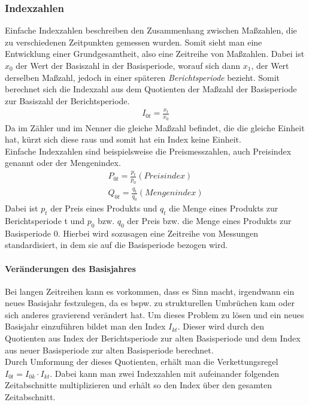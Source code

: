 \documentclass[a4paper]{article}
\begin{document}
\subsubsection{Indexzahlen}
Einfache Indexzahlen beschreiben den Zusammenhang zwischen Maßzahlen, die zu verschiedenen Zeitpunkten gemessen wurden. Somit sieht man eine Entwicklung einer Grundgesamtheit, also eine Zeitreihe von Maßzahlen. 
Dabei ist $x_0$ der Wert der Basiszahl in der Basisperiode, worauf sich dann $x_1$, der Wert derselben Maßzahl, jedoch in einer späteren \textit{Berichtsperiode} bezieht. Somit berechnet sich die Indexzahl aus dem Quotienten der Maßzahl der Basisperiode zur Basiszahl der Berichtsperiode.
\begin{align*}
    I_{0t}=\frac{x_t}{x_0}
\end{align*}
Da im Zähler und im Nenner die gleiche Maßzahl befindet, die die gleiche Einheit hat, kürzt sich diese raus und somit hat ein Index keine Einheit.\\
Einfache Indexzahlen sind beispielsweise die Preismesszahlen, auch Preisindex genannt oder der Mengenindex. 
\begin{align*}
    P_{0t}=\frac{p_t}{p_0} (Preisindex)\\
    Q_{0t}=\frac{q_t}{q_0} (Mengenindex)
\end{align*}
Dabei ist $p_t$ der Preis eines Produkts und $q_t$ die Menge eines Produkts zur Berichtsperiode t und $p_0$ bzw. $q_0$ der Preis bzw. die Menge eines Produkts zur Basisperiode 0. Hierbei wird sozusagen eine Zeitreihe von Messungen standardisiert, in dem sie auf die Basisperiode bezogen wird.

\paragraph{Veränderungen des Basisjahres} Bei langen Zeitreihen kann es vorkommen, dass es Sinn macht, irgendwann ein neues Basisjahr festzulegen, da es bspw. zu strukturellen Umbrüchen kam oder sich anderes gravierend verändert hat. Um dieses Problem zu lösen und ein neues Basisjahr einzuführen bildet man den Index $I_{kt}$. Dieser wird durch den Quotienten aus Index der Berichtsperiode zur alten Basisperiode und dem Index aus neuer Basisperiode zur alten Basisperiode berechnet. \\
Durch Umformung der dieses Quotienten, erhält man die Verkettungsregel$I_{0t}=I_{0k}\cdot I_{kt}$. Dabei kann man zwei Indexzahlen mit aufeinander folgenden Zeitabschnitte multiplizieren und erhält so den Index über den gesamten Zeitabschnitt.
\end{document}
